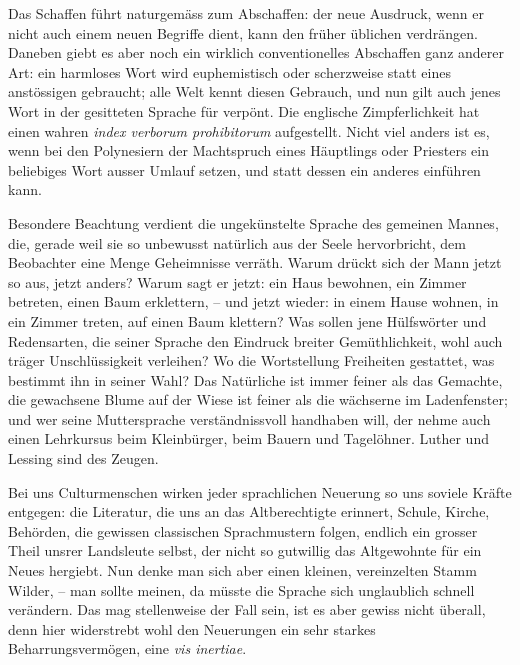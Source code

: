 Das Schaffen führt naturgemäss zum Abschaffen: der neue Ausdruck, wenn er nicht auch einem neuen Begriffe dient, kann den früher üblichen verdrängen. Daneben giebt es aber noch ein wirklich conventionelles Abschaffen ganz anderer Art: ein harmloses Wort wird euphemistisch oder scherzweise statt eines anstössigen gebraucht; alle Welt kennt diesen Gebrauch, und nun gilt auch jenes Wort in der gesitteten Sprache für verpönt. Die englische Zimpferlichkeit hat einen wahren \textit{index verborum prohibitorum} aufgestellt. Nicht viel anders ist es, wenn bei den Polynesiern der Machtspruch eines Häuptlings oder Priesters ein beliebiges Wort ausser Umlauf setzen, und statt dessen ein anderes einführen kann.

Besondere Beachtung verdient die ungekünstelte Sprache des gemeinen Mannes, die, gerade weil sie so unbewusst natürlich aus der Seele hervorbricht, dem Beobachter eine Menge Geheimnisse verräth. Warum drückt sich der Mann jetzt so aus, jetzt anders? Warum sagt er jetzt: ein Haus bewohnen, ein Zimmer \label{sp.46} betreten, einen Baum erklettern, – und jetzt wieder: in einem Hause wohnen, in ein Zimmer treten, auf einen Baum klettern? Was sollen jene  Hülfswörter und Redensarten, die seiner Sprache den Eindruck breiter Gemüthlichkeit, wohl auch träger Unschlüssigkeit verleihen? Wo die Wortstellung Freiheiten gestattet, was bestimmt ihn in seiner Wahl? Das Natürliche ist immer feiner als das Gemachte, die gewachsene Blume auf der Wiese ist feiner als die wächserne im Ladenfenster; und wer seine Muttersprache verständnissvoll handhaben will, der nehme auch einen Lehrkursus beim Kleinbürger, beim Bauern und Tagelöhner. Luther und Lessing sind des Zeugen. 

Bei uns Culturmenschen wirken jeder sprachlichen Neuerung so uns soviele  Kräfte entgegen: die Literatur, die uns an das Altberechtigte erinnert, Schule, Kirche, Behörden, die gewissen classischen Sprachmustern folgen, endlich ein grosser Theil unsrer Landsleute selbst, der nicht so gutwillig das Altgewohnte für ein Neues hergiebt. Nun denke man sich aber einen kleinen, vereinzelten Stamm Wilder, – man sollte meinen, da müsste die Sprache sich unglaublich schnell verändern. Das mag stellenweise der Fall sein, ist es aber gewiss nicht überall, \label{fp.47} denn hier widerstrebt wohl den Neuerungen ein sehr starkes Beharrungsvermögen, eine \textit{vis inertiae}.

